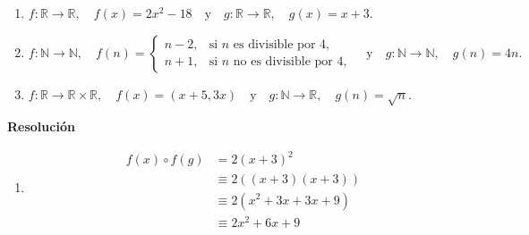 \documentclass[11pt]{article}
\begin{document}
\begin{enumerate}[label=\roman*)]
    \item $f:\mathbb{R}\to\mathbb{R}, \quad f(x)=2x^{2}-18 
    \quad \text{y} \quad 
    g:\mathbb{R}\to\mathbb{R}, \quad g(x)=x+3.$

    \item $f:\mathbb{N}\to\mathbb{N}, \quad 
    f(n)=
    \begin{cases}
        n-2, & \text{si $n$ es divisible por $4$},\\[6pt]
        n+1, & \text{si $n$ no es divisible por $4$},
    \end{cases}
    \quad \text{y} \quad
    g:\mathbb{N}\to\mathbb{N}, \quad g(n)=4n.$

    \item $f:\mathbb{R}\to \mathbb{R}\times\mathbb{R}, \quad f(x)=(x+5,3x) 
    \quad \text{y} \quad 
    g:\mathbb{N}\to\mathbb{R}, \quad g(n)=\sqrt{n}.$
\end{enumerate}

\textbf{Resolución}

\begin{enumerate}[label=\roman*)]
    \item \begin{align*}
        f(x) \circ f(g) &= 2(x + 3)^{2} \\
        &\equiv 2 ((x + 3) (x + 3)) \\
        &\equiv 2 (x^{2} + 3x + 3x + 9) \\
        &\equiv 2x^{2} + 6x + 9 
    \end{align*}
\end{enumerate}
\end{document}
